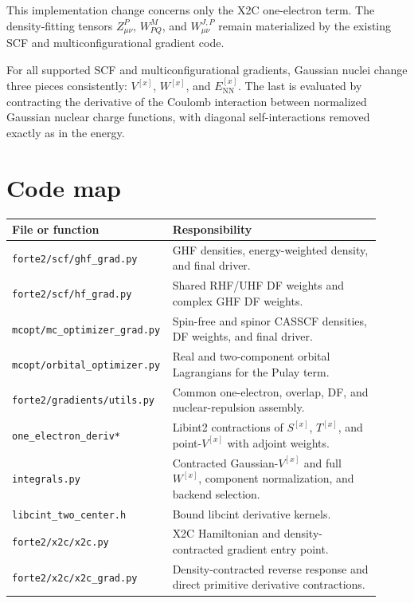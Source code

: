 \documentclass[aip,jcp,preprint]{revtex4-1}
\newcommand{\xcoord}{{[x]}}
\begin{document}
This implementation change concerns only the X2C one-electron term.  The
density-fitting tensors $Z^P_{\mu\nu}$, $W^M_{PQ}$, and
$W^{J,P}_{\mu\nu}$ remain materialized by the existing SCF and
multiconfigurational gradient code.

For all supported SCF and multiconfigurational gradients, Gaussian nuclei
change three pieces consistently: $V^\xcoord$, $W^\xcoord$, and
$E_\mathrm{NN}^\xcoord$.  The last is
evaluated by contracting the derivative of the Coulomb interaction between
normalized Gaussian nuclear charge functions, with diagonal self-interactions
removed exactly as in the energy.

\section{Code map}

\begin{center}
\begin{tabular}{p{0.35\linewidth}p{0.57\linewidth}}
\toprule
File or function & Responsibility \\
\midrule
\texttt{forte2/scf/ghf\_grad.py} & GHF densities, energy-weighted density, and final driver.\\
\texttt{forte2/scf/hf\_grad.py} & Shared RHF/UHF DF weights and complex GHF DF weights.\\
\texttt{mcopt/mc\_optimizer\_grad.py} & Spin-free and spinor CASSCF densities, DF weights, and final driver.\\
\texttt{mcopt/orbital\_optimizer.py} & Real and two-component orbital Lagrangians for the Pulay term.\\
\texttt{forte2/gradients/utils.py} & Common one-electron, overlap, DF, and nuclear-repulsion assembly.\\
\texttt{one\_electron\_deriv*} & Libint2 contractions of $S^\xcoord$, $T^\xcoord$, and point-$V^\xcoord$ with adjoint weights.\\
\texttt{integrals.py} & Contracted Gaussian-$V^\xcoord$ and full $W^\xcoord$, component normalization, and backend selection.\\
\texttt{libcint\_two\_center.h} & Bound libcint derivative kernels.\\
\texttt{forte2/x2c/x2c.py} & X2C Hamiltonian and density-contracted gradient entry point.\\
\texttt{forte2/x2c/x2c\_grad.py} & Density-contracted reverse response and direct primitive derivative contractions.\\
\bottomrule
\end{tabular}
\end{center}
\end{document}
